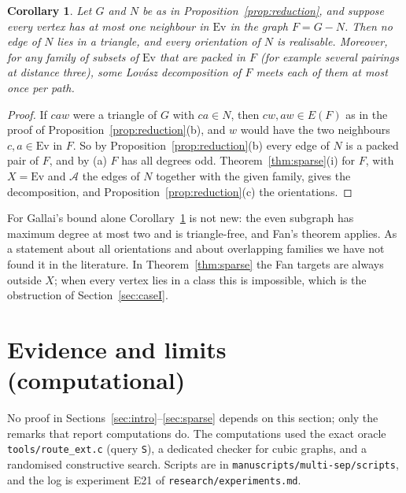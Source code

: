 \documentclass[11pt]{amsart}
\newtheorem{corollary}[theorem]{Corollary}
\theoremstyle{definition}
\newcommand{\Ev}{\mathrm{Ev}}
\newcommand{\cA}{\mathcal A}
\begin{document}
\begin{corollary}\label{cor:sparse}
Let $G$ and $N$ be as in Proposition~\ref{prop:reduction}, and suppose every vertex has at most one
neighbour in $\Ev$ in the graph $F=G-N$. Then no edge of $N$ lies in a triangle, and every orientation of $N$
is realisable. Moreover, for any family of subsets of $\Ev$ that are packed in $F$ (for example several
pairings at distance three), some Lov\'asz decomposition of $F$ meets each of them at most once per path.
\end{corollary}

\begin{proof}
If $caw$ were a triangle of $G$ with $ca\in N$, then $cw,aw\in E(F)$ as in the proof of
Proposition~\ref{prop:reduction}(b), and $w$ would have the two neighbours $c,a\in\Ev$ in $F$. So by
Proposition~\ref{prop:reduction}(b) every edge of $N$ is a packed pair of $F$, and by (a) $F$ has all degrees
odd. Theorem~\ref{thm:sparse}(i) for $F$, with $X=\Ev$ and $\cA$ the edges of $N$ together with the given
family, gives the decomposition, and Proposition~\ref{prop:reduction}(c) the orientations.
\end{proof}

For Gallai's bound alone Corollary~\ref{cor:sparse} is not new: the even subgraph has maximum degree at most
two and is triangle-free, and Fan's theorem applies. As a statement about all orientations and about
overlapping families we have not found it in the literature. In Theorem~\ref{thm:sparse} the Fan targets are always outside $X$; when every vertex lies in a
class this is impossible, which is the obstruction of Section~\ref{sec:caseI}.

\section{Evidence and limits (computational)}\label{sec:limits}

No proof in Sections~\ref{sec:intro}--\ref{sec:sparse} depends on this section; only the remarks that
report computations do. The computations used the exact oracle \texttt{tools/route\_ext.c} (query
\texttt{S}), a dedicated checker for cubic graphs, and a randomised constructive search. Scripts are in
\texttt{manuscripts/multi-sep/scripts}, and the log is experiment E21 of \texttt{research/experiments.md}.
\end{document}
